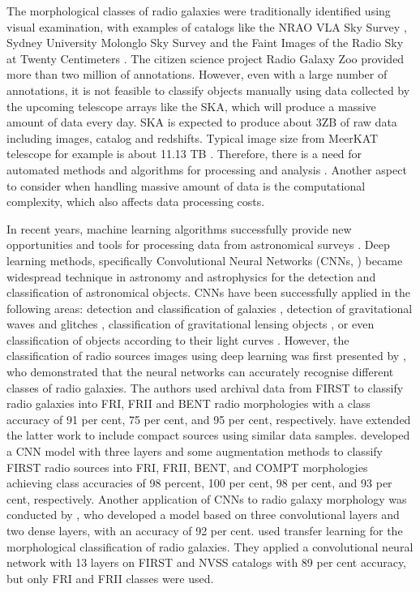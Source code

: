 \documentclass[fleqn,usenatbib]{mnras}
\begin{document}
The morphological classes of radio galaxies were traditionally identified using visual examination, with examples of catalogs like the NRAO VLA Sky Survey  \citep[NVSS; ][]{Condon1998},  Sydney University Molonglo Sky Survey \citep[SUMSS;][]{sumss} and the Faint Images of the Radio Sky at Twenty Centimeters \citep[FIRST;][]{first} . The citizen science project Radio Galaxy Zoo \citep[RGZ;][]{banfield2015radio, Wu2019}provided more than two million of annotations. However, even with a large number of annotations, it is not feasible to classify objects manually using data  collected by the upcoming telescope arrays like the SKA, which will produce a massive amount of data every day. SKA is expected to produce about 3ZB of raw data \cite[150 TB per day;][]{Garofalo2017} including images, catalog and redshifts. Typical image size from MeerKAT telescope for example is about 11.13 TB \citep{3}. Therefore, there is a need for automated methods and algorithms for processing and analysis \citep{Norris2017}. Another aspect to consider when handling massive amount of data is the computational complexity, which also affects data processing costs.

In recent years, machine learning algorithms successfully provide new opportunities and tools for processing data from astronomical surveys \citep[e.g.][]{2,3}. Deep learning methods, specifically Convolutional Neural Networks (CNNs, \cite{lecun2015deep}) became widespread technique in astronomy and astrophysics for the detection and classification of astronomical objects. CNNs have been successfully applied in the following areas: detection and classification of galaxies \citep{Ackermann2018, galaxy2, galaxy4}, detection of gravitational waves and glitches \citep{deep1, deep2, glitches1, glitches2}, classification of gravitational lensing objects \citep{lens1, lens2}, or even classification of objects according to their  light curves \citep{light_curve2}. However, the classification of radio sources images using deep learning was first presented by \citet{3}, who demonstrated that the neural networks can accurately recognise different classes of radio galaxies. The authors used archival data from FIRST to classify radio galaxies into FRI, FRII and BENT radio morphologies with a class accuracy of 91 per cent, 75 per cent, and 95 per cent, respectively. \citet{2} have extended the latter work to include compact sources using similar data samples. \citet{2} developed a CNN model with three layers and some augmentation methods  to classify  FIRST radio sources into FRI, FRII, BENT, and COMPT morphologies achieving  class accuracies of 98 percent, 100 per cent, 98 per cent, and 93 per cent, respectively. Another application of CNNs to radio galaxy morphology was conducted by \citet{Lukic_2018}, who developed a model based on three convolutional layers and two dense layers, with an accuracy of 92 per cent. \cite{1} used transfer learning for the morphological classification of radio galaxies. They applied a convolutional neural network with 13 layers on FIRST and NVSS catalogs with 89 per cent accuracy, but only FRI and FRII classes were used. 
\end{document}
